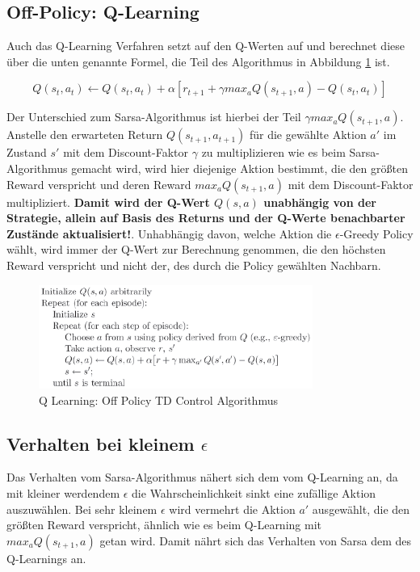 \documentclass[10pt]{scrartcl}
\begin{document}
\subsection{Off-Policy: Q-Learning}
Auch das Q-Learning Verfahren setzt auf den Q-Werten auf und berechnet diese über die unten genannte Formel, die Teil des Algorithmus in Abbildung \ref{fig:QLearning} ist.

\begin{equation}
Q(s_{t},a_{t}) \leftarrow Q(s_{t},a_{t}) + \alpha [r_{t+1} + \gamma max_{a} Q(s_{t+1},a) - Q(s_{t},a_{t})]
\end{equation} 

Der Unterschied zum Sarsa-Algorithmus ist hierbei der Teil $\gamma max_{a} Q(s_{t+1},a)$. Anstelle den erwarteten Return $Q(s_{t+1},a_{t+1})$ für die gewählte Aktion $a'$ im Zustand $s'$ mit dem Discount-Faktor $\gamma$ zu multiplizieren wie es beim Sarsa-Algorithmus gemacht wird, wird hier diejenige Aktion bestimmt, die den größten Reward verspricht und deren Reward $max_{a} Q(s_{t+1},a)$ mit dem Discount-Faktor multipliziert. \textbf{Damit wird der Q-Wert $Q(s,a)$ unabhängig von der Strategie, allein auf Basis des Returns und der Q-Werte benachbarter Zustände aktualisiert!}. 
Unhabhängig davon, welche Aktion die $\epsilon$-Greedy Policy wählt, wird immer der Q-Wert zur Berechnung genommen, die den höchsten Reward verspricht und nicht der, des durch die Policy gewählten Nachbarn. 

\begin{figure}[htbp]
	\centering	\includegraphics[width=0.8\textwidth]{Bilder/Q-Learning.png}
	\caption{Q Learning: Off Policy TD Control Algorithmus}
	\label{fig:QLearning}
\end{figure}


\subsection{Verhalten bei kleinem $\epsilon$}
Das Verhalten vom Sarsa-Algorithmus nähert sich dem vom Q-Learning an, da mit kleiner werdendem $\epsilon$ die Wahrscheinlichkeit sinkt eine zufällige Aktion auszuwählen. Bei sehr kleinem $\epsilon$ wird vermehrt die Aktion $a'$ ausgewählt, die den größten Reward verspricht, ähnlich wie es beim Q-Learning mit $max_{a} Q(s_{t+1},a)$ getan wird. Damit nährt sich das Verhalten von Sarsa dem des Q-Learnings an.
\end{document}
